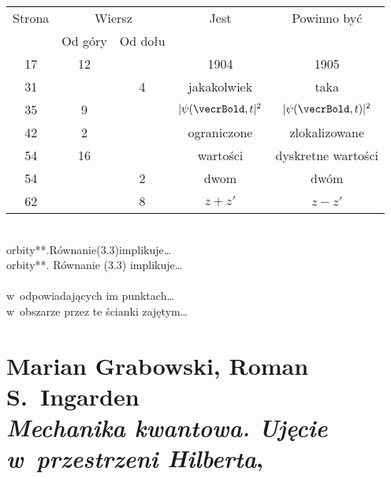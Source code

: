 \documentclass[a4paper,11pt]{article}
\numberwithin{equation}{section}
\begin{document}
\noindent



\begin{center}

  \begin{tabular}{|c|c|c|c|c|}
    \hline
    Strona & \multicolumn{2}{c|}{Wiersz} & Jest
                              & Powinno być \\ \cline{2-3}
    & Od góry & Od dołu & & \\
    \hline
    17 & 12 & & 1904 & 1905 \\
    31 & & 4 & jakakolwiek & taka \\
    35 & 9 & & $| \psi( \vecrBold, t |^{ 2 }$ & $| \psi( \vecrBold, t ) |^{ 2 }$ \\
    42 & 2 & & ograniczone & zlokalizowane \\
    54 & 16 & & wartości & dyskretne wartości \\
    54 & & 2 & dwom & dwóm \\
    62 & & 8 & $z + z'$ & $z - z'$ \\
    \hline
  \end{tabular}

\end{center}

\VerSpaceFour


\noindent
{} \\
\Jest orbity**.Równanie(3.3)implikuje\ldots \\
\PowinnoByc orbity**. Równanie (3.3) implikuje\ldots \\
 \\
\Jest w~odpowiadających im punktach\ldots  \\
\PowinnoByc w~obszarze przez te ścianki zajętym\ldots \\













\newpage

\section{Marian Grabowski, Roman S.~Ingarden \\
  \textit{Mechanika kwantowa. Ujęcie w~przestrzeni
    Hilberta},
  \parencite{GrabowskiIngardenMechanikaKwantowa1987}}
\end{document}
